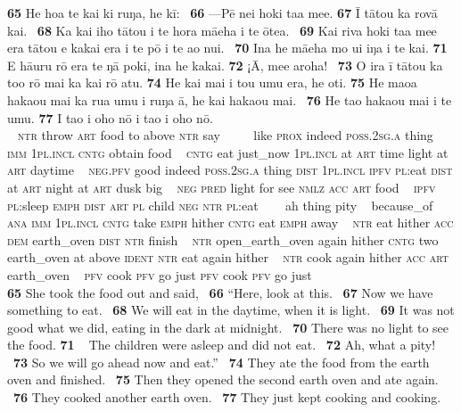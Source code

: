 \bigskip\gll
\textbf{\textup{65}} He hoa te kai ki ruŋa, he kī: ~\textbf{\textup{66}} —Pē nei hoki ta{\ꞌ}a me{\ꞌ}e. \textbf{\textup{67}} {\ꞌ}\=I tātou ka rovā kai. ~\textbf{\textup{68}} Ka kai iho tātou {\ꞌ}i te hora mā{\ꞌ}eha {\ꞌ}i te {\ꞌ}ōtea. ~\textbf{\textup{69}} Kai riva hoki ta{\ꞌ}a me{\ꞌ}e era tātou e kakai era {\ꞌ}i te pō {\ꞌ}i te {\ꞌ}ao nui. ~\textbf{\textup{70}} {\ꞌ}Ina he mā{\ꞌ}eha mo u{\ꞌ}i iŋa i te kai. \textbf{\textup{71}} E hā{\ꞌ}uru rō era te ŋā poki, {\ꞌ}ina he kakai. \textbf{\textup{72}} ¡{\ꞌ}\=A, me{\ꞌ}e {\ꞌ}aroha! ~\textbf{\textup{73}} {\ꞌ}O ira {\ꞌ}ī tātou ka to{\ꞌ}o rō mai ka kai rō atu. \textbf{\textup{74}} He kai mai i tou {\ꞌ}umu era, he oti. \textbf{\textup{75}} He ma{\ꞌ}oa haka{\ꞌ}ou mai ka rua {\ꞌ}umu {\ꞌ}i ruŋa {\ꞌ}ā, he kai haka{\ꞌ}ou mai. ~\textbf{\textup{76}} He ta{\ꞌ}o haka{\ꞌ}ou mai i te {\ꞌ}umu. \textbf{\textup{77}} I ta{\ꞌ}o i oho nō i ta{\ꞌ}o i oho nō.\\
~ \textsc{ntr} throw \textsc{art} food to above \textsc{ntr} say ~ ~~~like \textsc{prox} indeed \textsc{poss.2sg.a} thing  ~ \textsc{imm} \textsc{1pl.incl} \textsc{cntg} obtain food ~ \textsc{cntg} eat just\_now \textsc{1pl.incl} at \textsc{art} time light at \textsc{art} daytime ~ \textsc{neg.pfv} good indeed \textsc{poss.2sg.a} thing \textsc{dist} \textsc{1pl.incl} \textsc{ipfv} \textsc{pl}:eat \textsc{dist} at \textsc{art} night at \textsc{art} dusk big ~ \textsc{neg} \textsc{pred} light for see \textsc{nmlz} \textsc{acc} \textsc{art} food  ~ \textsc{ipfv} \textsc{pl}:sleep \textsc{emph} \textsc{dist} \textsc{art} \textsc{pl} child \textsc{neg} \textsc{ntr} \textsc{pl}:eat  ~ ~~ah thing pity ~ because\_of \textsc{ana} \textsc{imm} \textsc{1pl.incl} \textsc{cntg} take \textsc{emph} hither \textsc{cntg} eat \textsc{emph} away ~ \textsc{ntr} eat hither \textsc{acc} \textsc{dem} earth\_oven \textsc{dist} \textsc{ntr} finish  ~ \textsc{ntr} open\_earth\_oven again hither \textsc{cntg} two earth\_oven at above \textsc{ident} \textsc{ntr} eat again hither ~ \textsc{ntr} cook again hither \textsc{acc} \textsc{art} earth\_oven  ~ \textsc{pfv} cook \textsc{pfv} go just \textsc{pfv} cook \textsc{pfv} go just\\

\medskip\glt
\textbf{\textup{65}} She took the food out and said, ~\textbf{\textup{66}} “Here, look at this. ~\textbf{\textup{67}} Now we have something to eat. ~\textbf{\textup{68}} We will eat in the daytime, when it is light. ~\textbf{\textup{69}} It was not good what we did, eating in the dark at midnight. ~\textbf{\textup{70}} There was no light to see the food. \textbf{\textup{71~~}}The children were asleep and did not eat. ~\textbf{\textup{72}} Ah, what a pity! ~\textbf{\textup{73}} So we will go ahead now and eat.” ~\textbf{\textup{74}} They ate the food from the earth oven and finished. ~\textbf{\textup{75}} Then they opened the second earth oven and ate again. ~\textbf{\textup{76}} They cooked another earth oven. ~\textbf{\textup{77}} They just kept cooking and cooking.


